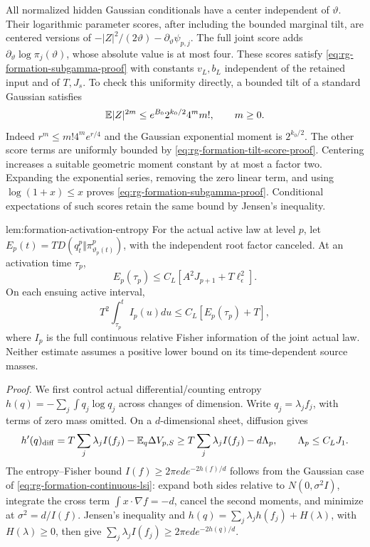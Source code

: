 All normalized hidden Gaussian conditionals have a center independent
of $\vartheta$. Their logarithmic parameter scores, after including
the bounded marginal tilt, are centered versions of
$-|Z|^2/(2\vartheta)-\partial_\vartheta\psi_{p,j}$.
The full joint score adds
$\partial_\vartheta\log\pi_j(\vartheta)$, whose absolute value is at
most four. These scores satisfy
\cref{eq:rg-formation-subgamma-proof} with constants $v_L,b_L$
independent of the retained input and of $T,J_s$. To check this
uniformity directly, a bounded tilt of a standard Gaussian satisfies
\begin{equation}
 \mathbb E|Z|^{2m}
 \le e^{B_0}2^{k_0/2}4^m m!,\qquad m\ge0.
 \label{eq:rg-formation-gaussian-score-moments}
\end{equation}
Indeed $r^m\le m!4^m e^{r/4}$ and the Gaussian exponential moment is
$2^{k_0/2}$. The other score terms are uniformly bounded by
\cref{eq:rg-formation-tilt-score-proof}. Centering increases a
suitable geometric moment constant by at most a factor two. Expanding
the exponential series, removing the zero linear term, and using
$\log(1+x)\le x$ proves \cref{eq:rg-formation-subgamma-proof}.
Conditional expectations of such scores retain the same bound by
Jensen's inequality. 

{lem:formation-activation-entropy}
For the actual active law at level $p$, let
$E_p(t)=T D(q_t^p\Vert\pi_{\vartheta_p(t)}^p)$, with the independent
root factor canceled. At an activation time $\tau_p$,
\begin{equation}
 E_p(\tau_p)\le C_L[A^2J_{p+1}+T\ell_\epsilon^2].
 \label{eq:rg-formation-activation-budget}
\end{equation}
On each ensuing active interval,
\begin{equation}
 T^2\int_{\tau_p}^{t}I_p(u)du
 \le C_L[E_p(\tau_p)+T],
 \label{eq:rg-formation-full-fisher-budget}
\end{equation}
where $I_p$ is the full continuous relative Fisher information of
the joint actual law. Neither estimate assumes a positive lower
bound on its time-dependent source masses. 

\emph{Proof.}
We first control actual differential/counting entropy
$h(q)=-\sum_j\int q_j\log q_j$ across changes of dimension.
Write $q_j=\lambda_jf_j$, with terms of zero mass omitted. On a
$d$-dimensional sheet, diffusion gives
\begin{equation}
 h'(q)_{\mathrm{diff}}
 =T\sum_j\lambda_jI(f_j)-\mathbb E_q\Delta V_{p,S}
 \ge T\sum_j\lambda_jI(f_j)-d\Lambda_p,
 \qquad \Lambda_p\le C_LJ_1.
 \label{eq:rg-formation-actual-entropy-derivative}
\end{equation}
The entropy--Fisher bound
$I(f)\ge2\pi e d e^{-2h(f)/d}$ follows from the Gaussian case of
\cref{eq:rg-formation-continuous-lsi}: expand both sides relative to
$N(0,\sigma^2I)$, integrate the cross term
$\int x\cdot\nabla f=-d$, cancel the second moments, and minimize
at $\sigma^2=d/I(f)$. Jensen's inequality and
$h(q)=\sum_j\lambda_jh(f_j)+H(\lambda)$, with $H(\lambda)\ge0$,
then give
$\sum_j\lambda_j I(f_j)\ge2\pi e d e^{-2h(q)/d}$.

